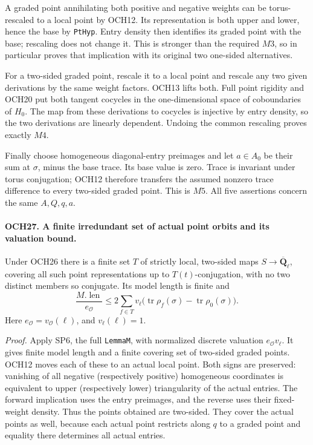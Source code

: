 \documentclass[11pt,a4paper]{article}
\numberwithin{equation}{section}
\theoremstyle{remark}\newtheorem{remark}[theorem]{Remark}
\begin{document}
A graded point annihilating both positive and negative weights can
be torus-rescaled to a local point by OCH12.  Its representation
is both upper and lower, hence the base by \texttt{Pt\allowbreak Hyp}.
Entry density then identifies its graded point with the base;
rescaling does not change it.  This is stronger than the required
\(M3\), so in particular proves that implication with its
original two one-sided alternatives.

For a two-sided graded point, rescale it to a local point and
rescale any two given derivations by the same weight factors.
OCH13 lifts both.  Full point rigidity and OCH20 put both tangent
cocycles in the one-dimensional space of coboundaries of \(H_0\).
The map from these derivations to cocycles is injective by entry
density, so the two derivations are linearly dependent.  Undoing
the common rescaling proves exactly \(M4\).

Finally choose homogeneous diagonal-entry preimages and let
\(a\in A_0\) be their sum at \(\sigma\), minus the base
trace.  Its base value is zero.  Trace is invariant under torus
conjugation; OCH12 therefore transfers the assumed nonzero trace
difference to every two-sided graded point.  This is \(M5\).
All five assertions concern the same \(A,Q,q,a\).

\paragraph{OCH27. A finite irredundant set of actual point orbits and its valuation bound.}
\label{claim:OCH27}
Under OCH26 there is a finite set \(T\) of strictly local,
two-sided maps \(S\to\overline{\mathbf Q}_\ell\), covering
all such point representations up to \(T(t)\)-conjugation,
with no two distinct members so conjugate.  Its model length is
finite and
\[
 \frac{M.\operatorname{len}}{e_{\mathcal O}}
       \le2\sum_{f\in T}v_\ell
        \bigl(\operatorname{tr}\rho_f(\sigma)
                    -\operatorname{tr}\rho_0(\sigma)\bigr).
 \tag{OCH.18}
\]
Here \(e_{\mathcal O}=v_{\mathcal O}(\ell)\), and
\(v_\ell(\ell)=1\).

\emph{Proof.}
Apply SP6, the full \texttt{Lemma\allowbreak M}, with normalized discrete
valuation \(e_{\mathcal O}v_\ell\).  It gives finite model
length and a finite covering set of two-sided graded points.
OCH12 moves each of these to an actual local point.  Both signs
are preserved: vanishing of all negative (respectively positive)
homogeneous coordinates is equivalent to upper (respectively lower)
triangularity of the actual entries.  The forward implication uses
the entry preimages, and the reverse uses their fixed-weight density.
Thus the points obtained are two-sided.  They cover the actual
points as well, because each actual point restricts along \(q\)
to a graded point and equality there determines all actual entries.
\end{document}
